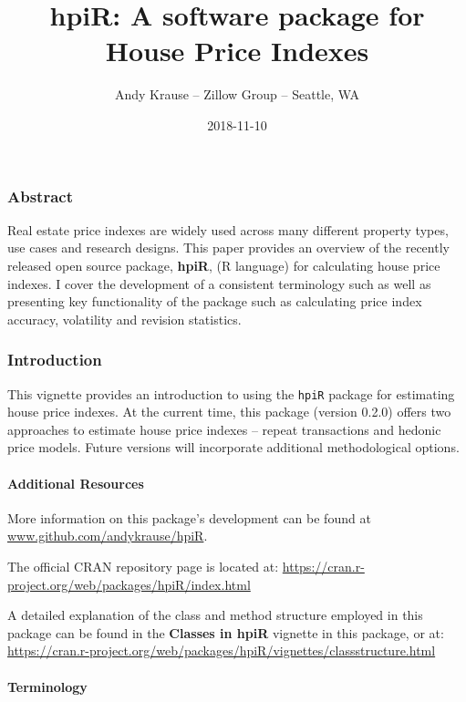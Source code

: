\documentclass[]{article}
\title{hpiR: A software package for House Price Indexes}
\author{Andy Krause -- Zillow Group -- Seattle, WA}
\date{2018-11-10}
\let\oldparagraph\paragraph
\renewcommand{\paragraph}[1]{\oldparagraph{#1}\mbox{}}
\begin{document}
\maketitle

\hypertarget{abstract}{%
\subsubsection{Abstract}\label{abstract}}

Real estate price indexes are widely used across many different property
types, use cases and research designs. This paper provides an overview
of the recently released open source package, \textbf{hpiR}, (R
language) for calculating house price indexes. I cover the development
of a consistent terminology such as well as presenting key functionality
of the package such as calculating price index accuracy, volatility and
revision statistics.

\hypertarget{introduction}{%
\subsubsection{Introduction}\label{introduction}}

This vignette provides an introduction to using the \texttt{hpiR}
package for estimating house price indexes. At the current time, this
package (version 0.2.0) offers two approaches to estimate house price
indexes -- repeat transactions and hedonic price models. Future versions
will incorporate additional methodological options.

\hypertarget{additional-resources}{%
\paragraph{Additional Resources}\label{additional-resources}}

More information on this package's development can be found at
\href{https://www.github.com/andykrause/hpiR}{www.github.com/andykrause/hpiR}.

The official CRAN repository page is located at:
\url{https://cran.r-project.org/web/packages/hpiR/index.html}

A detailed explanation of the class and method structure employed in
this package can be found in the \textbf{Classes in hpiR} vignette in
this package, or at:
\url{https://cran.r-project.org/web/packages/hpiR/vignettes/classstructure.html}

\hypertarget{terminology}{%
\paragraph{Terminology}\label{terminology}}
\end{document}

